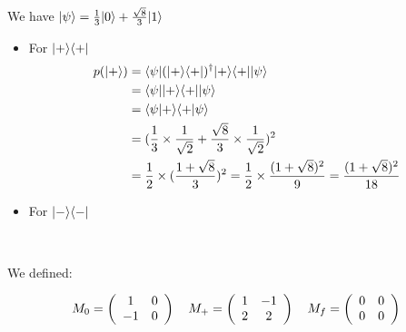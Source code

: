 We have $| \psi \rangle = \frac 1 3 | 0 \rangle + \frac{\sqrt 8} 3 | 1 \rangle$

\begin{itemize}
  \item For $| + \rangle \langle + |$
    \begin{align*}
      p(| + \rangle) &= \langle \psi | (| + \rangle \langle + |)^\dagger | + \rangle \langle + | | \psi \rangle \\
      &= \langle \psi | | + \rangle \langle + | | \psi \rangle \\
      &= \langle \psi | + \rangle \langle + | \psi \rangle \\
      &= (\frac 1 3 \times \frac 1 {\sqrt 2} + \frac {\sqrt 8} 3 \times \frac 1
        {\sqrt 2})^2 \\
      &= \frac 1 2 \times (\frac{1 + \sqrt 8} 3)^2
      = \frac 1 2 \times \frac {(1 + \sqrt 8)^2} 9
      = \frac {(1 + \sqrt 8)^2}{18}
    \end{align*}

  \item For $| - \rangle \langle - |$
\end{itemize}

~

We defined:

\begin{align*}
M_0 = \left(\begin{array}{c c}
  1  & 0\\
  -1 & 0
\end{array}\right)
\quad 
M_+ = \left(\begin{array}{c c}
  1 & -1\\
  2 &  2
\end{array}\right)
\quad
M_f = \left(\begin{array}{c c}
  0 & 0\\
  0 & 0
\end{array}\right)
\end{align*}


